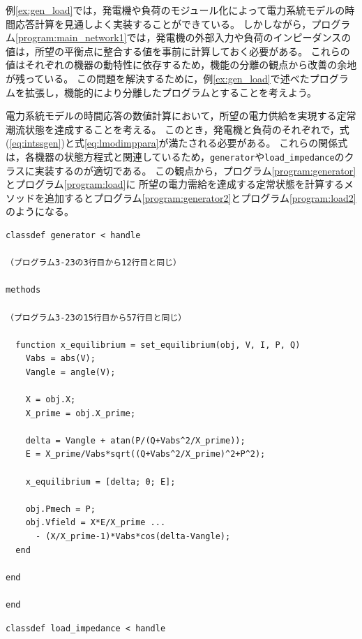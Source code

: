 \documentclass[tombow,dvipdfmx]{corona-a5-1.1}
\begin{document}
例\ref{ex:gen_load}では，発電機や負荷のモジュール化によって電力系統モデルの時間応答計算を見通しよく実装することができている。
しかしながら，プログラム\nobreak\ref{program:main_network1}では，発電機の外部入力や負荷のインピーダンスの値は，所望の平衡点に整合する値を事前に計算しておく必要がある。
これらの値はそれぞれの機器の動特性に依存するため，機能の分離の観点から改善の余地が残っている。
この問題を解決するために，例\ref{ex:gen_load}で述べたプログラムを拡張し，機能的により分離したプログラムとすることを考えよう。


\begin{例}[発電機や負荷の定常状態を計算するメソッドの追加]
電力系統モデルの時間応答の数値計算において，所望の電力供給を実現する定常潮流状態を達成することを考える。
このとき，発電機と負荷のそれぞれで，式(\ref{eq:intssgen})と式\ref{eq:lmodimppara}が満たされる必要がある。
これらの関係式は，各機器の状態方程式と関連しているため，\verb|generator|や\verb|load_impedance|のクラスに実装するのが適切である。
この観点から，プログラム\ref{program:generator}とプログラム\ref{program:load}に
所望の電力需給を達成する定常状態を計算するメソッドを追加するとプログラム\nobreak\ref{program:generator2}とプログラム\ref{program:load2}のようになる。

\smallskip
\begin{PROGRAMA}[count,title={generator.m}]\label{program:generator2}
  \begin{verbatim}
classdef generator < handle
  
（プログラム3-23の3行目から12行目と同じ）

methods

（プログラム3-23の15行目から57行目と同じ）

  function x_equilibrium = set_equilibrium(obj, V, I, P, Q)
    Vabs = abs(V);
    Vangle = angle(V);
    
    X = obj.X;
    X_prime = obj.X_prime;
    
    delta = Vangle + atan(P/(Q+Vabs^2/X_prime));
    E = X_prime/Vabs*sqrt((Q+Vabs^2/X_prime)^2+P^2);
    
    x_equilibrium = [delta; 0; E];
    
    obj.Pmech = P;
    obj.Vfield = X*E/X_prime ...
      - (X/X_prime-1)*Vabs*cos(delta-Vangle);
  end

end
  
end
\end{verbatim}
\end{PROGRAMA}

\smallskip
\begin{PROGRAMA}[count,title={load\_impedance.m}]\label{program:load2}
\begin{verbatim}
classdef load_impedance < handle
  

\end{verbatim}
\end{PROGRAMA}
\end{例}
\end{document}
